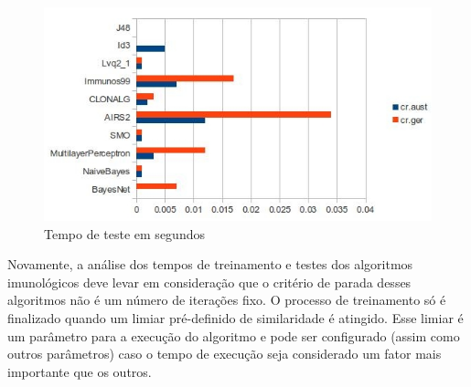\begin{figure}[h]
    \vspace{0.5cm}
    \centering
    \caption{Tempo de teste em segundos}
    \label{fig:dev_graph_test_time}
    \label{fig:dev_graph_last}
    \includegraphics[width=1\textwidth]{img/graph_test_time.jpg}
\end{figure}

Novamente, a análise dos tempos de treinamento e testes dos algoritmos imunológicos deve levar em consideração que o critério de parada desses algoritmos não é um número de iterações fixo. O processo de treinamento só é finalizado quando um limiar pré-definido de similaridade é atingido. Esse limiar é um parâmetro para a execução do algoritmo e pode ser configurado (assim como outros parâmetros) caso o tempo de execução seja considerado um fator mais importante que os outros.
